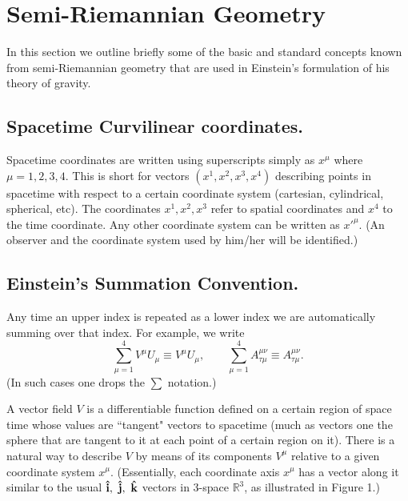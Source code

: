 \documentclass[12pt,reqno]{amsart}
\theoremstyle{definition}
\numberwithin{equation}{section}
\begin{document}


{\section{ Semi-Riemannian Geometry}}

In this section we outline briefly some of the basic and standard concepts known from semi-Riemannian geometry that are used in Einstein's formulation of his theory of gravity.

\medskip\subsection{ Spacetime Curvilinear coordinates.}

Spacetime coordinates are written using superscripts simply as $x^\mu$ where $\mu = 1, 2, 3, 4$. This is short for vectors $(x^1,x^2,x^3,x^4)$ describing points in spacetime with respect to a certain coordinate system (cartesian, cylindrical, spherical, etc). The coordinates $x^1,x^2,x^3$ refer to spatial coordinates and $x^4$ to the time coordinate. Any other coordinate system can be written as $x'^\mu$. (An observer and the coordinate system used by him/her will be identified.)

\medskip\subsection{ Einstein's Summation Convention.} 

Any time an upper index is repeated as a lower index we are automatically summing over that index. For example, we write
$$\sum_{\mu=1}^4 V^\mu U_\mu \equiv V^\mu U_\mu, \qquad
\sum_{\mu=1}^4 A^{\mu\nu}_{\tau\mu} \equiv A^{\mu\nu}_{\tau\mu}.$$
(In such cases one drops the $\sum$ notation.)

A vector field $V$ is a differentiable function defined on a certain region of space time whose values are ``tangent" vectors to spacetime (much as vectors one the sphere that are tangent to it at each point of a certain region on it). There is a natural way to describe $V$ by means of its components $V^\mu$ relative to a given coordinate system $x^\mu$. (Essentially, each coordinate axis $x^\mu$ has a vector along it similar to the usual $\bold{\hat i, \ \hat j, \ \hat k}$ vectors in 3-space $\mathbb R^3$, as illustrated in Figure 1.)
\end{document}
